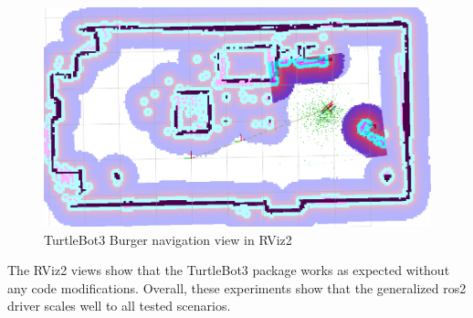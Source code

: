 \begin{figure}[H]
    \centering
    \includegraphics[width=\textwidth]{./results/figures/turtlebot_navigation}
    \caption{TurtleBot3 Burger navigation view in RViz2}
    \label{fig:results:turtlebot_navigation}
\end{figure}

The RViz2 views show that the TurtleBot3 package works as expected without any code modifications.
Overall, these experiments show that the generalized \ac{ros2} driver scales well to all tested scenarios.
